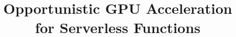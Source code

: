 \documentclass[sigplan,review,twocolumn,anonymous]{acmart}
\begin{document}

\title{Opportunistic GPU Acceleration for Serverless Functions}

\date{}

\author{}

\begin{abstract}

\end{abstract}

\maketitle 




 









%







\end{document}
